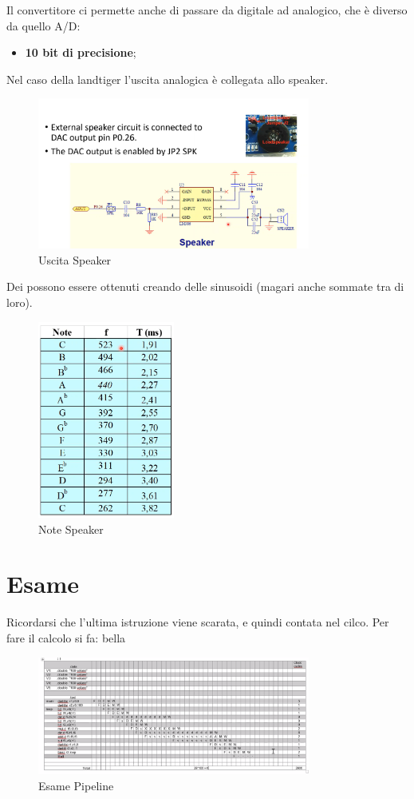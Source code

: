 \documentclass[12pt]{article}
\begin{document}
Il convertitore ci permette anche di passare da digitale ad analogico, che \`e diverso da quello A/D:
\begin{itemize}
    \item \textbf{10 bit di precisione};
\end{itemize}
Nel caso della landtiger l'uscita analogica \`e collegata allo speaker.
\begin{figure}[H]
    \centering
    \includegraphics[width=0.8\textwidth]{uscita-speaker.png}
    \caption{Uscita Speaker}
    \label{fig:uscita-speaker}
\end{figure}
Dei possono essere ottenuti creando delle sinusoidi (magari anche sommate tra di loro).
\begin{figure}
    \centering
    \includegraphics[width=0.4\textwidth]{note-speaker.png}
    \caption{Note Speaker}
    \label{fig:note-speaker}
\end{figure}





\newpage
\section{Esame}
Ricordarsi che l'ultima istruzione viene scarata, e quindi contata nel cilco. Per fare il calcolo si fa: bella
\begin{figure}[H]
    \centering
    \includegraphics[width=0.8\textwidth]{esame-pipeline.png}
    \caption{Esame Pipeline}
    \label{fig:esame-pipeline}
\end{figure}
\end{document}
